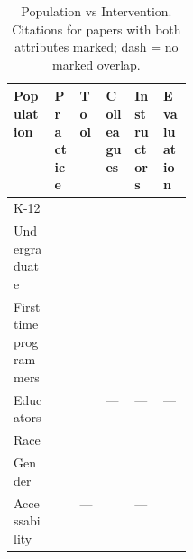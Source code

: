 \begin{table}[!htbp]
\centering
\small
\setlength{\tabcolsep}{4pt}
\renewcommand{\arraystretch}{1.3}
\caption{Population vs Intervention. Citations for papers with both attributes marked; dash = no marked overlap.}
\begin{tabularx}{\linewidth}{|>{\raggedright\arraybackslash}p{0.23\linewidth}|>{\centering\arraybackslash}X|>{\centering\arraybackslash}X|>{\centering\arraybackslash}X|>{\centering\arraybackslash}X|>{\centering\arraybackslash}X|}
\hline
\textbf{Population} & \textbf{\hspace{0pt}Practice} & \textbf{\hspace{0pt}Tool} & \textbf{\hspace{0pt}Colleagues} & \textbf{\hspace{0pt}Instructors} & \textbf{\hspace{0pt}Evaluation} \\ \hline
K-12 & \cite{anon2020title10} \cite{anon2020title22} \cite{anon2020title37} \cite{anon2020title8} & \cite{anon2020title37} \cite{anon2020title8} & \cite{anon2020title10} \cite{anon2020title22} \cite{anon2020title32} & \cite{anon2020title32} & \cite{anon2020title35} \cite{anon2020title8} \\ \hline
Undergraduate & \cite{anon2020title12} \cite{anon2020title45} & \cite{anon2020title12} \cite{anon2020title45} & \cite{anon2020title25} \cite{anon2020title28} \cite{anon2020title42} \cite{anon2020title48} \cite{anon2020title7} & \cite{anon2020title15} \cite{anon2020title25} \cite{anon2020title42} & \cite{anon2020title17} \cite{anon2020title19} \cite{anon2020title3} \cite{anon2020title48} \cite{anon2020title7} \\ \hline
First time programmers & \cite{anon2020title12} \cite{anon2020title45} & \cite{anon2020title12} \cite{anon2020title45} & \cite{anon2020title48} \cite{anon2020title7} & \cite{anon2020title15} & \cite{anon2020title17} \cite{anon2020title48} \cite{anon2020title7} \\ \hline
Educators & \cite{anon2020title37} & \cite{anon2020title37} & --- & --- & --- \\ \hline
Race & \cite{anon2020title8} & \cite{anon2020title8} & \cite{anon2020title32} & \cite{anon2020title15} \cite{anon2020title32} & \cite{anon2020title8} \\ \hline
Gender & \cite{anon2020title45} & \cite{anon2020title45} & \cite{anon2020title42} \cite{anon2020title7} & \cite{anon2020title15} \cite{anon2020title42} & \cite{anon2020title3} \cite{anon2020title35} \cite{anon2020title7} \\ \hline
Accessability & \cite{anon2020title22} & --- & \cite{anon2020title22} \cite{anon2020title48} & --- & \cite{anon2020title48} \\ \hline
\end{tabularx}
\end{table}
